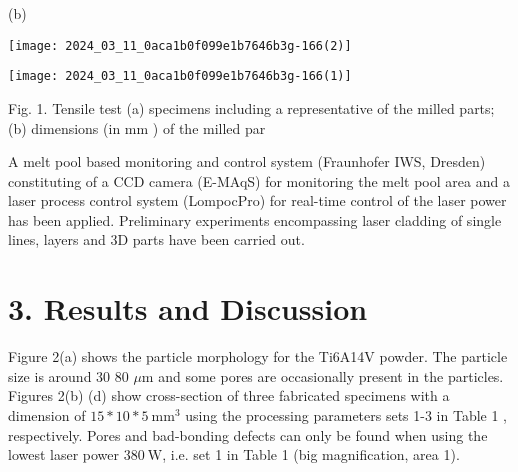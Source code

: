 \documentclass[10pt]{article}
\begin{document}
(b)

\begin{center}
\texttt{[image: 2024\_03\_11\_0aca1b0f099e1b7646b3g-166(2)]}
\end{center}

\begin{center}
\texttt{[image: 2024\_03\_11\_0aca1b0f099e1b7646b3g-166(1)]}
\end{center}

Fig. 1. Tensile test (a) specimens including a representative of the milled parts; (b) dimensions (in $\mathrm{mm}$ ) of the milled par

A melt pool based monitoring and control system (Fraunhofer IWS, Dresden) constituting of a CCD camera (E-MAqS) for monitoring the melt pool area and a laser process control system (LompocPro) for real-time control of the laser power has been applied. Preliminary experiments encompassing laser cladding of single lines, layers and 3D parts have been carried out.

\section*{3. Results and Discussion}
Figure 2(a) shows the particle morphology for the Ti6A14V powder. The particle size is around 30 80 $\mu \mathrm{m}$ and some pores are occasionally present in the particles. Figures 2(b) (d) show cross-section of three fabricated specimens with a dimension of $15 * 10 * 5 \mathrm{~mm}^{3}$ using the processing parameters sets 1-3 in Table 1 , respectively. Pores and bad-bonding defects can only be found when using the lowest laser power $380 \mathrm{~W}$, i.e. set 1 in Table 1 (big magnification, area 1).
\end{document}
